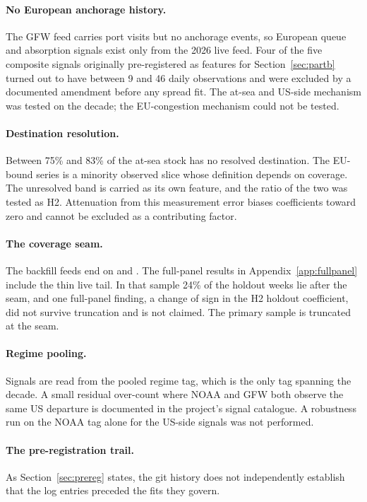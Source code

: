 \paragraph{No European anchorage history.} The GFW feed carries port visits but no
anchorage events, so European queue and absorption signals exist only from the 2026
live feed. Four of the five composite signals originally pre-registered as features
for Section~\ref{sec:partb} turned out to have between 9 and 46 daily observations
and were excluded by a documented amendment before any spread fit. The at-sea and
US-side mechanism was tested on the decade; the EU-congestion mechanism could not be
tested.

\paragraph{Destination resolution.} Between 75\% and 83\% of the at-sea stock has no
resolved destination. The EU-bound series is a minority observed slice whose
definition depends on coverage. The unresolved band is carried as its own feature,
and the ratio of the two was tested as H2. Attenuation from this measurement error
biases coefficients toward zero and cannot be excluded as a contributing factor.

\paragraph{The coverage seam.} The backfill feeds end on \noaaEnds{} and \gfwEnds.
The full-panel results in Appendix~\ref{app:fullpanel} include the thin live tail.
In that sample 24\% of the holdout weeks lie after the seam, and one full-panel
finding, a change of sign in the H2 holdout coefficient, did not survive truncation
and is not claimed. The primary sample is truncated at the seam.

\paragraph{Regime pooling.} Signals are read from the pooled regime tag, which is
the only tag spanning the decade. A small residual over-count where NOAA and GFW both
observe the same US departure is documented in the project's signal catalogue. A
robustness run on the NOAA tag alone for the US-side signals was not performed.

\paragraph{The pre-registration trail.} As Section~\ref{sec:prereg} states, the git
history does not independently establish that the log entries preceded the fits they
govern.

